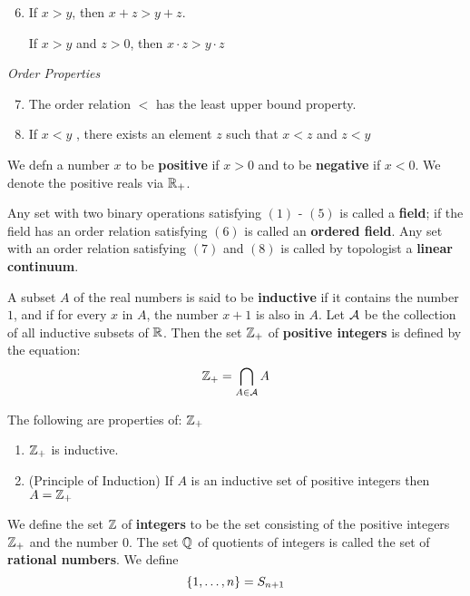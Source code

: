 \begin{enumerate}
	\setcounter{enumi}{5}
	\item If $ x > y$, then $ x +z > y+z $.
	
	If $ x > y  $ and $ z > 0 $, then $ x \cdot z > y \cdot z $
\end{enumerate}

\textit{Order Properties}

\begin{enumerate}
	\setcounter{enumi}{6}
	\item The order relation $ < $ has the least upper bound property.
	\item If $ x < y $ , there exists an element $z$ such that $ x < z$ and $ z < y$
\end{enumerate}

We defn a number $x$ to be \textbf{positive} if $  x > 0 $ and to be \textbf{negative} if $ x<0 $. We denote the positive reals via $\mathbb{R}_+$.

Any set with two binary operations satisfying $(1)$ - $(5)$ is called a \textbf{field}; if the field has an order relation satisfying $ (6) $ is called an \textbf{ordered field}. Any set with an order relation satisfying $(7)$ and $(8)$ is called by topologist a \textbf{linear continuum}.

\begin{defn}
	A subset $A$ of the real numbers is said to be \textbf{inductive} if it contains the number $1$, and if for every $x$ in $A$, the number $x+1$ is also in $A$. Let $\mathcal{A}$ be the collection of all inductive subsets of $\mathbb{R}$. Then the set $\mathbb{Z}_+$ of \textbf{positive integers} is defined by the equation:
	\[ \mathbb{Z}_+ = \bigcap_{A \in \mathcal{A}} A \]
	
\end{defn}

The following are properties of: $ \mathbb{Z}_+ $ 

\begin{enumerate}
	\item $ \mathbb{Z}_+ $ is inductive.
	\item (Principle of Induction) If $A$ is an inductive set of positive integers then $ A= \mathbb{Z}_+ $
\end{enumerate}
We define the set $ \mathbb{Z} $ of \textbf{integers} to be the set consisting of the positive integers $ \mathbb{Z}_+ $ and the number $ 0  $. The set $ \mathbb{Q}  $ of quotients of integers is called the set of \textbf{rational numbers}.
We define
\[ \left\lbrace 1, \ldots, n \right\rbrace = S_{n+1} \]

